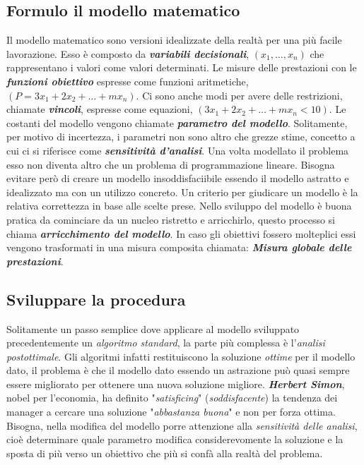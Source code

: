 \documentclass{article}
\begin{document}
\subsection{Formulo il modello matematico}
Il modello matematico sono versioni idealizzate della realtà per una più facile lavorazione. Esso è composto da \textbf{\textit{variabili decisionali}}, $(x_1,\dots,x_n)$ che rappresentano i valori come valori determinati. Le misure delle prestazioni con le \textbf{\textit{funzioni obiettivo}} espresse come funzioni aritmetiche, $(P=3x_1+2x_2+\dots+mx_n)$. Ci sono anche modi per avere delle restrizioni, chiamate \textbf{\textit{vincoli}}, espresse come equazioni, $(3x_1+2x_2+\dots+mx_n<10)$. Le costanti del modello vengono chiamate \textbf{\textit{parametro del modello}}. Solitamente, per motivo di incertezza, i parametri non sono altro che grezze stime, concetto a cui ci si riferisce come \textbf{\textit{sensitività d'analisi}}. Una volta modellato il problema esso non diventa altro che un problema di programmazione lineare. Bisogna evitare però di creare un modello insoddisfaciibile essendo il modello astratto e idealizzato ma con un utilizzo concreto. Un criterio per giudicare un modello è la relativa correttezza in base alle scelte prese. Nello sviluppo del modello è buona pratica da cominciare da un nucleo ristretto e arricchirlo, questo processo si chiama \textbf{\textit{arricchimento del modello}}. In caso gli obiettivi fossero molteplici essi vengono trasformati in una misura composita chiamata: \textbf{\textit{Misura globale delle prestazioni}}.

\subsection{Sviluppare la procedura}
Solitamente un passo semplice dove applicare al modello sviluppato precedentemente un \textit{algoritmo standard}, la parte più complessa è l'\textit{analisi postottimale}. Gli algoritmi infatti restituiscono la soluzione \textit{ottime} per il modello dato, il problema è che il modello dato essendo un astrazione può quasi sempre essere migliorato per ottenere una nuova soluzione migliore. \textbf{\textit{Herbert Simon}}, nobel per l'economia, ha definito "\textit{satisficing}" (\textit{soddisfacente}) la tendenza dei manager a cercare una soluzione "\textit{abbastanza buona}" e non per forza ottima. Bisogna, nella modifica del modello porre attenzione alla \textit{sensitività delle analisi}, cioè determinare quale parametro modifica considerevomente la soluzione e la sposta di più verso un obiettivo che più si confà alla realtà del problema.
\end{document}
